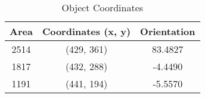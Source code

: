 \newpage


\begin{table}[h]
    \centering
    \begin{tabular}{|c|c|c|}
    \hline
    \textbf{Area} & \textbf{Coordinates (x, y)} & \textbf{Orientation} \\
    \hline
    2514 & (429, 361) & 83.4827 \\
    1817 & (432, 288) & -4.4490 \\
    1191 & (441, 194) & -5.5570 \\
    \hline
    \end{tabular}
    \caption{Object Coordinates}
    \label{tab:object_properties}
\end{table}
    




